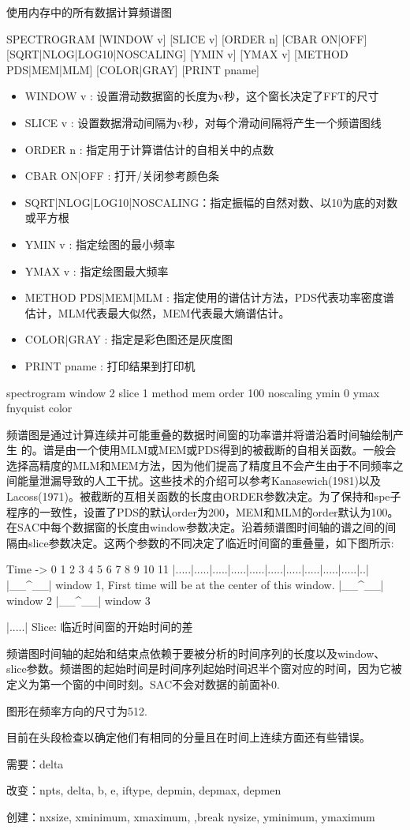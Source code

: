 \label{cmd:spectrogram}

使用内存中的所有数据计算频谱图

\begin{SACSTX}
SPECTROGRAM [WINDOW v] [SLICE v] [ORDER n] [CBAR ON|OFF] 
    [SQRT|NLOG|LOG10|NOSCALING]
    [YMIN v] [YMAX v] [METHOD PDS|MEM|MLM] [COLOR|GRAY] 
    [PRINT pname]
\end{SACSTX}

\begin{itemize}
\item WINDOW v : 设置滑动数据窗的长度为v秒，这个窗长决定了FFT的尺寸 
\item SLICE v : 设置数据滑动间隔为v秒，对每个滑动间隔将产生一个频谱图线 
\item ORDER n : 指定用于计算谱估计的自相关中的点数 
\item CBAR ON|OFF : 打开/关闭参考颜色条 
\item SQRT|NLOG|LOG10|NOSCALING：指定振幅的自然对数、以10为底的对数或平方根
\item YMIN v : 指定绘图的最小频率  
\item YMAX v : 指定绘图最大频率 
\item METHOD PDS|MEM|MLM : 指定使用的谱估计方法，PDS代表功率密度谱估计，MLM代表最大似然，MEM代表最大熵谱估计。  
\item COLOR|GRAY : 指定是彩色图还是灰度图 
\item PRINT pname : 打印结果到打印机  
\end{itemize}

\begin{SACDFT}
spectrogram window 2 slice 1 method mem order 100 noscaling
    ymin 0 ymax fnyquist color
\end{SACDFT}

频谱图是通过计算连续并可能重叠的数据时间窗的功率谱并将谱沿着时间轴绘制产生	的。谱是由一个使用MLM或MEM或PDS得到的被截断的自相关函数。一般会选择高精度的MLM和MEM方法，因为他们提高了精度且不会产生由于不同频率之间能量泄漏导致的人工干扰。这些技术的介绍可以参考Kanasewich(1981)以及Lacoss(1971)。被截断的互相关函数的长度由ORDER参数决定。为了保持和spe子程序的一致性，设置了PDS的默认order为200，MEM和MLM的order默认为100。在SAC中每个数据窗的长度由window参数决定。沿着频谱图时间轴的谱之间的间隔由slice参数决定。这两个参数的不同决定了临近时间窗的重叠量，如下图所示:
\begin{SACCode}
Time ->
0  1  2  3  4  5  6  7  8  9 10 11
|.....|.....|.....|.....|.....|.....|.....|.....|.....|.....|..|
|__^__| window 1, First time will be at the center of this window.
      |__^__| window 2
            |__^__| window 3

|.....| Slice: 临近时间窗的开始时间的差
\end{SACCode}
频谱图时间轴的起始和结束点依赖于要被分析的时间序列的长度以及window、slice参数。频谱图的起始时间是时间序列起始时间迟半个窗对应的时间，因为它被定义为第一个窗的中间时刻。SAC不会对数据的前面补0.

图形在频率方向的尺寸为512.

目前在头段检查以确定他们有相同的分量且在时间上连续方面还有些错误。

需要：delta

改变：npts, delta, b, e, iftype, depmin, depmax, depmen

创建：nxsize, xminimum, xmaximum, ,break nysize, yminimum, ymaximum
